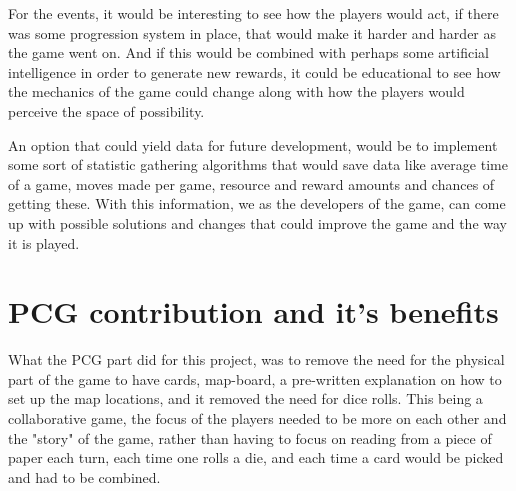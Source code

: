 For the events, it would be interesting to see how the players would act, if there was some progression system in place, that would make it harder and harder as the game went on. And if this would be combined with perhaps some artificial intelligence in order to generate new rewards, it could be educational to see how the mechanics of the game could change along with how the players would perceive the space of possibility.

An option that could yield data for future development, would be to implement some sort of statistic gathering algorithms that would save data like average time of a game, moves made per game, resource and reward amounts and chances of getting these. With this information, we as the developers of the game, can come up with possible solutions and changes that could improve the game and the way it is played.
\section{PCG contribution and it's benefits}
What the PCG part did for this project, was to remove the need for the physical part of the game to have cards, map-board, a pre-written explanation on how to set up the map locations, and it removed the need for dice rolls. This being a collaborative game, the focus of the players needed to be more on each other and the "story" of the game, rather than having to focus on reading from a piece of paper each turn, each time one rolls a die, and each time a card would be picked and had to be combined.

